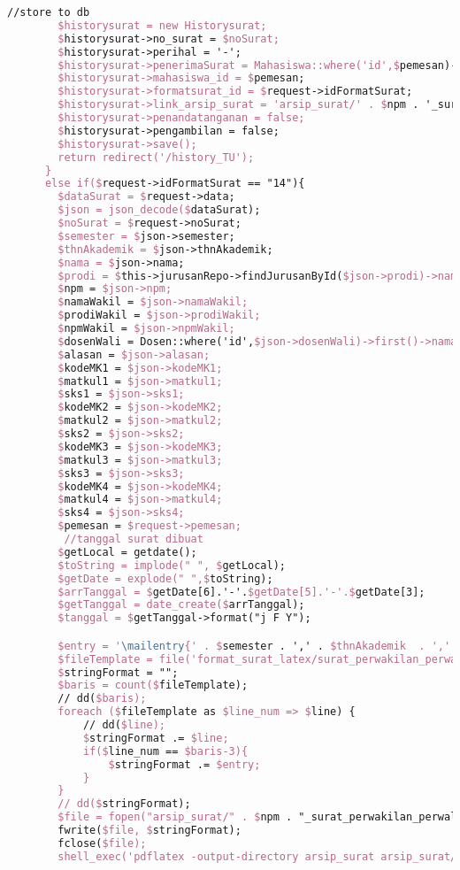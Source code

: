 \begin{lstlisting}[language=tex,basicstyle=\tiny,caption=HistorysuratController.php]
        //store to db
        $historysurat = new Historysurat;
        $historysurat->no_surat = $noSurat;
        $historysurat->perihal = '-';
        $historysurat->penerimaSurat = Mahasiswa::where('id',$pemesan)->first()->dosen->nama_dosen;
        $historysurat->mahasiswa_id = $pemesan;
        $historysurat->formatsurat_id = $request->idFormatSurat;
        $historysurat->link_arsip_surat = 'arsip_surat/' . $npm . '_surat_perwakilan_perwalian_3mk.pdf';
        $historysurat->penandatanganan = false;
        $historysurat->pengambilan = false;
        $historysurat->save();
        return redirect('/history_TU');
      }
      else if($request->idFormatSurat == "14"){
        $dataSurat = $request->data;
        $json = json_decode($dataSurat);
        $noSurat = $request->noSurat;
        $semester = $json->semester;
        $thnAkademik = $json->thnAkademik;
        $nama = $json->nama;
        $prodi = $this->jurusanRepo->findJurusanById($json->prodi)->nama_jurusan;
        $npm = $json->npm;
        $namaWakil = $json->namaWakil;
        $prodiWakil = $json->prodiWakil;
        $npmWakil = $json->npmWakil;
        $dosenWali = Dosen::where('id',$json->dosenWali)->first()->nama_dosen;
        $alasan = $json->alasan;
        $kodeMK1 = $json->kodeMK1;
        $matkul1 = $json->matkul1;
        $sks1 = $json->sks1;
        $kodeMK2 = $json->kodeMK2;
        $matkul2 = $json->matkul2;
        $sks2 = $json->sks2;
        $kodeMK3 = $json->kodeMK3;
        $matkul3 = $json->matkul3;
        $sks3 = $json->sks3;
        $kodeMK4 = $json->kodeMK4;
        $matkul4 = $json->matkul4;
        $sks4 = $json->sks4;
        $pemesan = $request->pemesan;
         //tanggal surat dibuat
        $getLocal = getdate();
        $toString = implode(" ", $getLocal);
        $getDate = explode(" ",$toString);
        $arrTanggal = $getDate[6].'-'.$getDate[5].'-'.$getDate[3];
        $getTanggal = date_create($arrTanggal);
        $tanggal = $getTanggal->format("j F Y");

        $entry = '\mailentry{' . $semester . ',' . $thnAkademik  . ',' . $nama . ',' . $prodi . ',' . $npm . ',' . $namaWakil . ',' . $prodiWakil . ',' . $npmWakil . ',' . $dosenWali . ',' . $alasan . ',' . $kodeMK1 . ',' . $matkul1 . ',' . $sks1 . ',' . $kodeMK2 . ',' . $matkul2 . ',' . $sks2 . ',' . $kodeMK3 . ',' . $matkul3 . ',' . $sks3 . ',' . $kodeMK4 . ',' . $matkul4 . ',' . $sks4 . ',' . $tanggal . '}';
        $fileTemplate = file('format_surat_latex/surat_perwakilan_perwalian_4mk.tex');
        $stringFormat = "";
        $baris = count($fileTemplate);
        // dd($baris);
        foreach ($fileTemplate as $line_num => $line) {
            // dd($line);
            $stringFormat .= $line;
            if($line_num == $baris-3){
                $stringFormat .= $entry;
            }
        }
        // dd($stringFormat);
        $file = fopen("arsip_surat/" . $npm . "_surat_perwakilan_perwalian_4mk.tex", "w");
        fwrite($file, $stringFormat);
        fclose($file);
        shell_exec('pdflatex -output-directory arsip_surat arsip_surat/' . $npm . '_surat_perwakilan_perwalian_4mk.tex');


\end{lstlisting}
